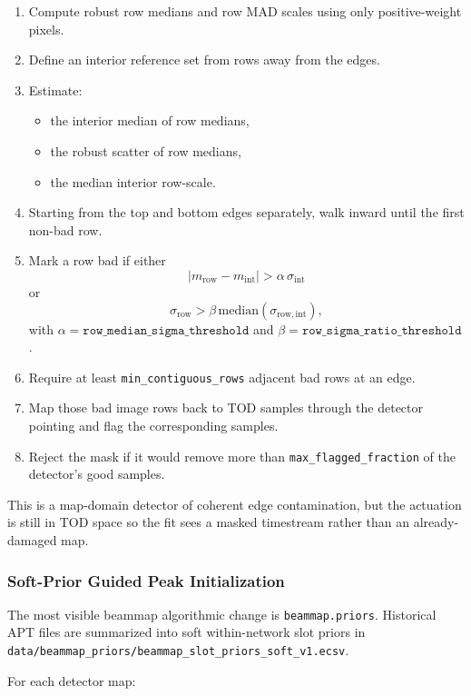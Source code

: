\documentclass[11pt]{article}
\begin{document}
\begin{enumerate}[leftmargin=1.5em]
\item Compute robust row medians and row MAD scales using only positive-weight
pixels.
\item Define an interior reference set from rows away from the edges.
\item Estimate:
\begin{itemize}[leftmargin=1.5em]
\item the interior median of row medians,
\item the robust scatter of row medians,
\item the median interior row-scale.
\end{itemize}
\item Starting from the top and bottom edges separately, walk inward until the
first non-bad row.
\item Mark a row bad if either
\[
|m_{\mathrm{row}} - m_{\mathrm{int}}| >
\alpha \, \sigma_{\mathrm{int}}
\]
or
\[
\sigma_{\mathrm{row}} > \beta \, \mathrm{median}(\sigma_{\mathrm{row,int}}),
\]
with \(\alpha=\texttt{row\_median\_sigma\_threshold}\) and
\(\beta=\texttt{row\_sigma\_ratio\_threshold}\).
\item Require at least \texttt{min\_contiguous\_rows} adjacent bad rows at an
edge.
\item Map those bad image rows back to TOD samples through the detector
pointing and flag the corresponding samples.
\item Reject the mask if it would remove more than
\texttt{max\_flagged\_fraction} of the detector's good samples.
\end{enumerate}

This is a map-domain detector of coherent edge contamination, but the actuation
is still in TOD space so the fit sees a masked timestream rather than an
already-damaged map.

\subsubsection{Soft-Prior Guided Peak Initialization}

The most visible beammap algorithmic change is
\texttt{beammap.priors}. Historical APT files are summarized into soft
within-network slot priors in
\texttt{data/beammap\_priors/beammap\_slot\_priors\_soft\_v1.ecsv}.

For each detector map:
\end{document}
